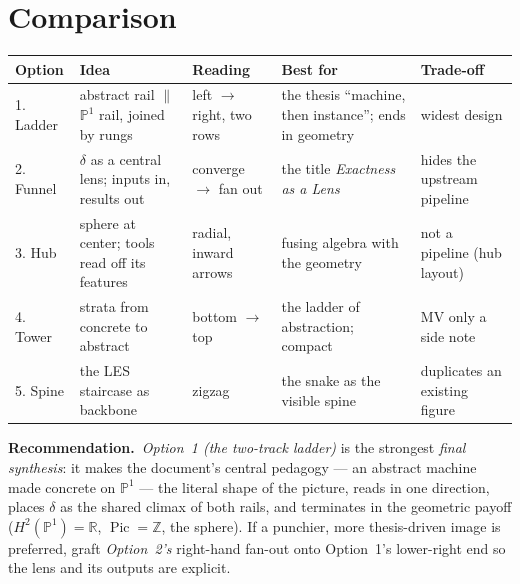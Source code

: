 \documentclass[11pt]{article}
\newcommand{\RR}{\mathbb R}
\newcommand{\ZZ}{\mathbb Z}
\newcommand{\PP}{\mathbb P}
\newcommand{\Pic}{\operatorname{Pic}}
\begin{document}
\section*{Comparison}
\begin{center}\footnotesize
\renewcommand{\arraystretch}{1.3}
\begin{tabular}{@{}p{1.5cm} p{3.0cm} p{2.3cm} p{3.0cm} p{3.0cm}@{}}
\toprule
\textbf{Option} & \textbf{Idea} & \textbf{Reading} & \textbf{Best for} & \textbf{Trade-off}\\
\midrule
1. Ladder & abstract rail $\parallel$ $\PP^1$ rail, joined by rungs & left $\to$ right, two rows &
  the thesis ``machine, then instance''; ends in geometry & widest design\\
2. Funnel & $\delta$ as a central lens; inputs in, results out & converge $\to$ fan out &
  the title \emph{Exactness as a Lens} & hides the upstream pipeline\\
3. Hub & sphere at center; tools read off its features & radial, inward arrows &
  fusing algebra with the geometry & not a pipeline (hub layout)\\
4. Tower & strata from concrete to abstract & bottom $\to$ top &
  the ladder of abstraction; compact & MV only a side note\\
5. Spine & the LES staircase as backbone & zigzag &
  the snake as the visible spine & duplicates an existing figure\\
\bottomrule
\end{tabular}
\end{center}

\medskip
\noindent\textbf{Recommendation.}\ \emph{Option~1 (the two-track ladder)} is the
strongest \emph{final synthesis}: it makes the document's central pedagogy --- an
abstract machine made concrete on $\PP^1$ --- the literal shape of the picture,
reads in one direction, places $\delta$ as the shared climax of both rails, and
terminates in the geometric payoff ($H^2(\PP^1)=\RR$, $\Pic=\ZZ$, the sphere). If a
punchier, more thesis-driven image is preferred, graft \emph{Option~2's} right-hand
fan-out onto Option~1's lower-right end so the lens and its outputs are explicit.
\end{document}

